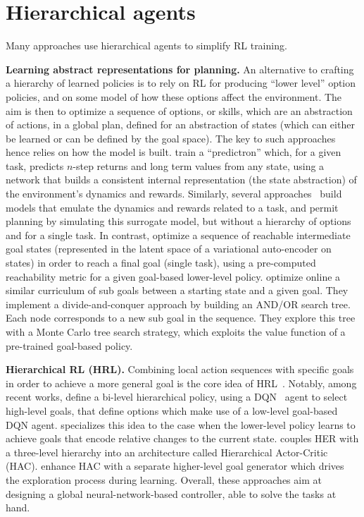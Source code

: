 \section{Hierarchical agents}

Many approaches use hierarchical agents to simplify RL training.

\textbf{Learning abstract representations for planning.}
An alternative to crafting a hierarchy of learned policies is to rely on RL for producing ``lower level'' option
policies, and on some model of how these options affect the environment.
The aim is then to optimize a sequence of options, or skills, which are an abstraction of actions, in a global plan,
defined for an abstraction of states (which can either be learned or can be defined by the goal space).
The key to such approaches hence relies on how the model is built.
\citet{silver2017predictron} train a ``predictron'' which, for a given task, predicts $n$-step returns and long term
values from any state, using a network that builds a consistent internal representation (the state abstraction) of the
environment's dynamics and rewards.
Similarly, several approaches~\citep{ha2018world,schrittwieser2020mastering,hafner2020dream,hafner2021mastering} build
models that emulate the dynamics and rewards related to a task, and permit planning by simulating this surrogate model,
but without a hierarchy of options and for a single task.
In contrast, \citet{nasiriany2019planning} optimize a sequence of reachable intermediate goal states (represented in the
latent space of a variational auto-encoder on states) in order to reach a final goal (single task), using a pre-computed
reachability metric for a given goal-based lower-level policy.
\citet{parascandolo2020divide} optimize online a similar curriculum of sub goals between a starting state and a given
goal.
They implement a divide-and-conquer approach by building an AND/OR search tree.
Each node corresponds to a new sub goal in the sequence.
They explore this tree with a Monte Carlo tree search strategy, which exploits the value function of a pre-trained
goal-based policy.

\textbf{Hierarchical RL (HRL).}
Combining local action sequences with specific goals in order to achieve a more general goal is the core idea of
HRL~\citep{sutton1999between,precup2000temporal,konidaris2009skill}.
Notably, among recent works, \citet{kulkarni2016hierarchical} define a bi-level hierarchical policy, using a
DQN~\citep{mnih2015human} agent to select high-level goals, that define options which make use of a low-level goal-based
DQN agent.
\citet{nachum2018data} specializes this idea to the case when the lower-level policy learns to achieve goals that
encode relative changes to the current state.
\citet{levy2019learning} couples HER with a three-level hierarchy into an architecture called Hierarchical Actor-Critic
(HAC).
\citet{mcclinton2021hac} enhance HAC with a separate higher-level goal generator which drives the exploration process
during learning.
Overall, these approaches aim at designing a global neural-network-based controller, able to solve the tasks at hand.

